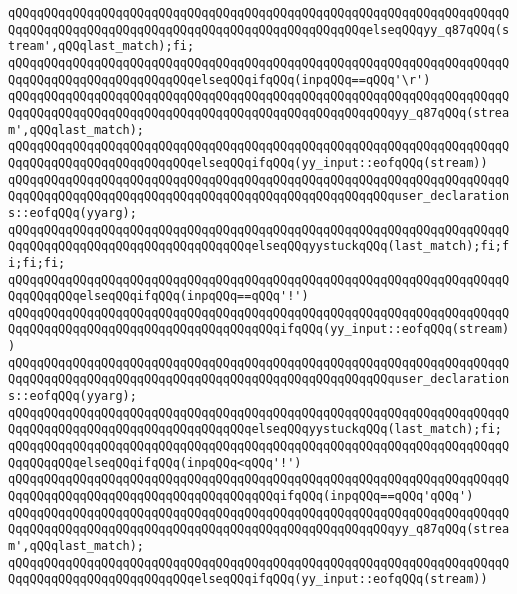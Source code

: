 \verb|qQQqqQQqqQQqqQQqqQQqqQQqqQQqqQQqqQQqqQQqqQQqqQQqqQQqqQQqqQQqqQQqqQQqqQQqqQQqqQQqqQQqqQQqqQQqqQQqqQQqqQQqqQQqqQQqqQQqqQQqelseqQQqyy_q87qQQq(stream',qQQqlast_match);fi;|\newline
\verb|qQQqqQQqqQQqqQQqqQQqqQQqqQQqqQQqqQQqqQQqqQQqqQQqqQQqqQQqqQQqqQQqqQQqqQQqqQQqqQQqqQQqqQQqqQQqqQQqelseqQQqifqQQq(inpqQQq==qQQq'\r')|\newline
\verb|qQQqqQQqqQQqqQQqqQQqqQQqqQQqqQQqqQQqqQQqqQQqqQQqqQQqqQQqqQQqqQQqqQQqqQQqqQQqqQQqqQQqqQQqqQQqqQQqqQQqqQQqqQQqqQQqqQQqqQQqqQQqyy_q87qQQq(stream',qQQqlast_match);|\newline
\verb|qQQqqQQqqQQqqQQqqQQqqQQqqQQqqQQqqQQqqQQqqQQqqQQqqQQqqQQqqQQqqQQqqQQqqQQqqQQqqQQqqQQqqQQqqQQqqQQqelseqQQqifqQQq(yy_input::eofqQQq(stream))|\newline
\verb|qQQqqQQqqQQqqQQqqQQqqQQqqQQqqQQqqQQqqQQqqQQqqQQqqQQqqQQqqQQqqQQqqQQqqQQqqQQqqQQqqQQqqQQqqQQqqQQqqQQqqQQqqQQqqQQqqQQqqQQqqQQquser_declarations::eofqQQq(yyarg);|\newline
\verb|qQQqqQQqqQQqqQQqqQQqqQQqqQQqqQQqqQQqqQQqqQQqqQQqqQQqqQQqqQQqqQQqqQQqqQQqqQQqqQQqqQQqqQQqqQQqqQQqqQQqqQQqelseqQQqyystuckqQQq(last_match);fi;fi;fi;fi;|\newline
\verb|qQQqqQQqqQQqqQQqqQQqqQQqqQQqqQQqqQQqqQQqqQQqqQQqqQQqqQQqqQQqqQQqqQQqqQQqqQQqqQQqelseqQQqifqQQq(inpqQQq==qQQq'!')|\newline
\verb|qQQqqQQqqQQqqQQqqQQqqQQqqQQqqQQqqQQqqQQqqQQqqQQqqQQqqQQqqQQqqQQqqQQqqQQqqQQqqQQqqQQqqQQqqQQqqQQqqQQqqQQqqQQqifqQQq(yy_input::eofqQQq(stream))|\newline
\verb|qQQqqQQqqQQqqQQqqQQqqQQqqQQqqQQqqQQqqQQqqQQqqQQqqQQqqQQqqQQqqQQqqQQqqQQqqQQqqQQqqQQqqQQqqQQqqQQqqQQqqQQqqQQqqQQqqQQqqQQqqQQquser_declarations::eofqQQq(yyarg);|\newline
\verb|qQQqqQQqqQQqqQQqqQQqqQQqqQQqqQQqqQQqqQQqqQQqqQQqqQQqqQQqqQQqqQQqqQQqqQQqqQQqqQQqqQQqqQQqqQQqqQQqqQQqqQQqelseqQQqyystuckqQQq(last_match);fi;|\newline
\verb|qQQqqQQqqQQqqQQqqQQqqQQqqQQqqQQqqQQqqQQqqQQqqQQqqQQqqQQqqQQqqQQqqQQqqQQqqQQqqQQqelseqQQqifqQQq(inpqQQq<qQQq'!')|\newline
\verb|qQQqqQQqqQQqqQQqqQQqqQQqqQQqqQQqqQQqqQQqqQQqqQQqqQQqqQQqqQQqqQQqqQQqqQQqqQQqqQQqqQQqqQQqqQQqqQQqqQQqqQQqqQQqifqQQq(inpqQQq==qQQq'qQQq')|\newline
\verb|qQQqqQQqqQQqqQQqqQQqqQQqqQQqqQQqqQQqqQQqqQQqqQQqqQQqqQQqqQQqqQQqqQQqqQQqqQQqqQQqqQQqqQQqqQQqqQQqqQQqqQQqqQQqqQQqqQQqqQQqqQQqyy_q87qQQq(stream',qQQqlast_match);|\newline
\verb|qQQqqQQqqQQqqQQqqQQqqQQqqQQqqQQqqQQqqQQqqQQqqQQqqQQqqQQqqQQqqQQqqQQqqQQqqQQqqQQqqQQqqQQqqQQqqQQqelseqQQqifqQQq(yy_input::eofqQQq(stream))|\newline
